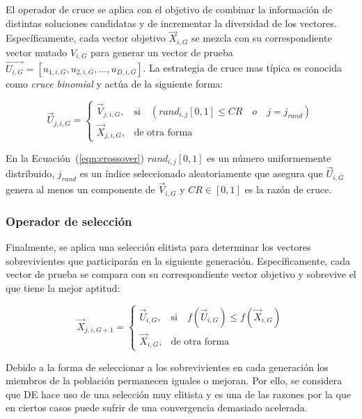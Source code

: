 \documentclass[preprint,12pt]{elsarticle}
\begin{document}
El operador de cruce se aplica con el objetivo de combinar la información de distintas soluciones candidatas y de incrementar la diversidad de los vectores.
%
Específicamente, cada vector objetivo $\vec{X}_{i,G}$ se mezcla con su correspondiente vector mutado $V_{i,G}$ para generar un vector de prueba $\vec{U_{i,G}} = [u_{1,i,G},u_{2,i,G}, ..., u_{D,i,G} ]$.
%
La estrategia de cruce mas típica es conocida como \textit{cruce binomial} y actúa de la siguiente forma:

\begin{equation} \label{eqn:crossover}
\vec{U}_{j,i,G}= 
\begin{cases}
    \vec{V}_{j,i,G},& \text{si} \quad (rand_{i,j}[0,1] \leq CR \quad o \quad j = j_{rand}  )\\
    \vec{X}_{j,i,G},              & \text{de otra forma}
\end{cases}
\end{equation}

En la Ecuación~(\ref{eqn:crossover}) $rand_{i,j}[0,1]$ es un número uniformemente distribuido, 
$j_{rand}$ es un índice seleccionado aleatoriamente que asegura que $\vec{U}_{i,G}$ genera al menos un componente 
de $\vec{V}_{i,G}$ y $CR \in [0,1]$ es la razón de cruce.

\subsubsection{Operador de selección}
Finalmente, se aplica una selección elitista para determinar los vectores sobrevivientes que participarán en la siguiente generación.
%
Específicamente, cada vector de prueba se compara con su correspondiente vector objetivo y sobrevive el que tiene la mejor aptitud:

\begin{equation} \label{eqn:selection}
\vec{X}_{j,i,G+1}= 
\begin{cases}
    \vec{U}_{i,G},& \text{si} \quad f(\vec{U}_{i,G}) \leq f(\vec{X}_{i,G})  \\
    \vec{X}_{i,G},              & \text{de otra forma}
\end{cases}
\end{equation}

Debido a la forma de seleccionar a los sobrevivientes en cada generación los miembros de la población permanecen iguales o mejoran.
%
Por ello, se considera que DE hace uso de una selección muy elitista y es una de las razones por la que en ciertos casos puede sufrir de una convergencia demasiado acelerada.
\end{document}
